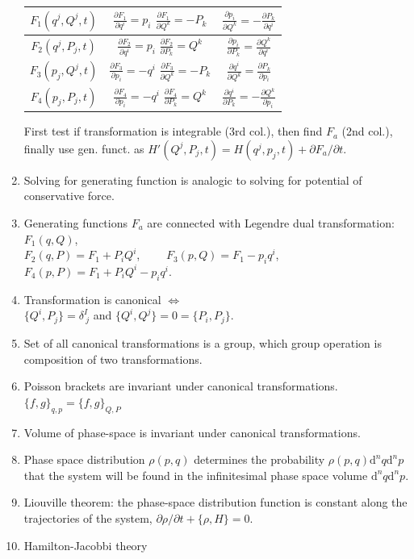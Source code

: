 \documentclass{article}
\renewcommand\d{\mathrm d}
\begin{document}
\begin{multicols}{3}
\begin{enumerate}
\begin{tabular}{|c|c|c|}
                \hline
                \rule{0pt}{3ex}
                $F_1(q^j,Q^j,t)$ & $\frac{\partial F_1}{\partial q^i}=p_i$ $\frac{\partial F_1}{\partial Q^k}=-P_k$ & $\frac{\partial p_i}{\partial Q^k}=-\frac{\partial P_k}{\partial q^i}$ \rule{0pt}{3ex}\\\hline
                \rule{0pt}{3ex}
                $F_2(q^j,P_j,t)$ & $\frac{\partial F_2}{\partial q^i}=p_i$ $\frac{\partial F_2}{\partial P_k}=Q^k$ & $\frac{\partial p_i}{\partial P_k}=\frac{\partial Q^k}{\partial q^i}$ \rule{0pt}{3ex}\\\hline
                \rule{0pt}{3ex}
                $F_3(p_j,Q^j,t)$ & $\frac{\partial F_3}{\partial p_i}=-q^i$ $\frac{\partial F_3}{\partial Q^k}=-P_k$ & $\frac{\partial q^i}{\partial Q^k}=\frac{\partial P_k}{\partial p_i}$ \rule{0pt}{3ex}\\\hline
                \rule{0pt}{3ex}
                $F_4(p_j,P_j,t)$ & $\frac{\partial F_4}{\partial p_i}=-q^i$ $\frac{\partial F_4}{\partial P_k}=Q^k$ & $\frac{\partial q^i}{\partial P_k}=-\frac{\partial Q^k}{\partial p_i}$ \rule{0pt}{3ex}\\\hline
            \end{tabular}
            First test if transformation is integrable (3rd col.), then find $F_a$ (2nd col.), finally use gen. funct. as
            $H'(Q^j,P_j,t)=H(q^j,p_j,t)+\partial F_a/\partial t$.
            \item Solving for generating function is analogic to solving for potential of conservative force.
            \item Generating functions $F_a$ are connected with Legendre dual transformation:
            $F_1(q,Q)$,\\$F_2(q,P)=F_1+P_iQ^i$,~~~~ $F_3(p,Q)=F_1-p_iq^i$,\\$F_4(p,P)=F_1+P_iQ^i-p_iq^i$.
            \item Transformation is canonical $\Leftrightarrow$\\ $\{Q^i,P_j\}=\delta^I_{~j}$ and $\{Q^i,Q^j\}=0=\{P_i,P_j\}$.
            \item Set of all canonical transformations is a group, which group operation is composition of two transformations.
            \item Poisson brackets are invariant under canonical transformations. $\{f,g\}_{q,p}=\{f,g\}_{Q,P}$
            \item Volume of phase-space is invariant under canonical transformations.
            \item Phase space distribution $\rho(p,q)$ determines the probability $\rho(p,q)\d^nq\d^np$ that the system will be found in the infinitesimal phase space volume $\d^nq\d^np$.
            \item Liouville theorem: the phase-space distribution function is constant along the trajectories of the system, $\partial\rho/\partial t+\{\rho,H\}=0$.
            \item {\color{red} Hamilton-Jacobbi theory}
        \end{enumerate}


\end{multicols}
\end{document}
